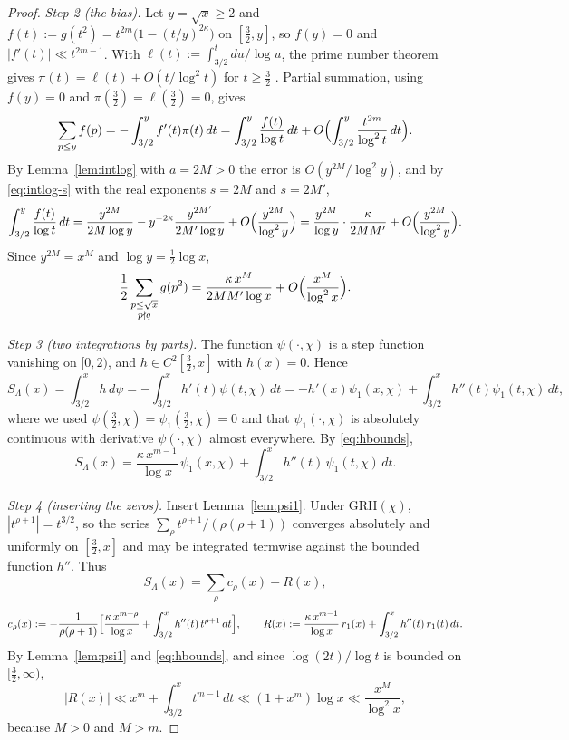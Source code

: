\documentclass[11pt]{amsart}
\theoremstyle{definition}
\numberwithin{equation}{section}
\begin{document}
\begin{proof}
\emph{Step 2 (the bias).} Let $y=\sqrt x\ge2$ and
$f(t):=g(t^2)=t^{2m}\bigl(1-(t/y)^{2\kappa}\bigr)$ on $[\tfrac32,y]$,
so $f(y)=0$ and $|f'(t)|\ll t^{2m-1}$. With
$\ell(t):=\int_{3/2}^t du/\log u$, the prime number theorem gives
$\pi(t)=\ell(t)+O(t/\log^2t)$ for $t\ge\tfrac32$
\cite[\S18]{Dav00}. Partial summation, using $f(y)=0$ and
$\pi(\tfrac32)=\ell(\tfrac32)=0$, gives
\[
\sum_{p\le y}f(p)=-\int_{3/2}^yf'(t)\pi(t)\,dt
=\int_{3/2}^y\frac{f(t)}{\log t}\,dt
+O\Bigl(\int_{3/2}^y\frac{t^{2m}}{\log^2t}\,dt\Bigr).
\]
By Lemma~\ref{lem:intlog} with $a=2M>0$ the error is
$O(y^{2M}/\log^2y)$, and by \eqref{eq:intlog-s} with the real
exponents $s=2M$ and $s=2M'$,
\[
\int_{3/2}^y\frac{f(t)}{\log t}\,dt
=\frac{y^{2M}}{2M\log y}-y^{-2\kappa}\frac{y^{2M'}}{2M'\log y}
+O\Bigl(\frac{y^{2M}}{\log^2y}\Bigr)
=\frac{y^{2M}}{\log y}\cdot\frac{\kappa}{2MM'}
+O\Bigl(\frac{y^{2M}}{\log^2y}\Bigr).
\]
Since $y^{2M}=x^M$ and $\log y=\tfrac12\log x$,
\begin{equation}\label{eq:biasterm}
\frac12\sum_{\substack{p\le\sqrt x\\ p\nmid q}}g(p^2)
=\frac{\kappa\,x^M}{2MM'\log x}+O\Bigl(\frac{x^M}{\log^2x}\Bigr).
\end{equation}

\emph{Step 3 (two integrations by parts).} The function
$\psi(\cdot,\chi)$ is a step function vanishing on $[0,2)$, and
$h\in C^2[\tfrac32,x]$ with $h(x)=0$. Hence
\[
S_\Lambda(x)=\int_{3/2}^xh\,d\psi=-\int_{3/2}^xh'(t)\psi(t,\chi)\,dt
=-h'(x)\psi_1(x,\chi)+\int_{3/2}^xh''(t)\psi_1(t,\chi)\,dt ,
\]
where we used $\psi(\tfrac32,\chi)=\psi_1(\tfrac32,\chi)=0$ and that
$\psi_1(\cdot,\chi)$ is absolutely continuous with derivative
$\psi(\cdot,\chi)$ almost everywhere. By \eqref{eq:hbounds},
\begin{equation}\label{eq:SLpsi1}
S_\Lambda(x)=\frac{\kappa\,x^{m-1}}{\log x}\,\psi_1(x,\chi)
+\int_{3/2}^xh''(t)\,\psi_1(t,\chi)\,dt .
\end{equation}

\emph{Step 4 (inserting the zeros).} Insert Lemma~\ref{lem:psi1}.
Under GRH$(\chi)$, $|t^{\rho+1}|=t^{3/2}$, so the series
$\sum_\rho t^{\rho+1}/(\rho(\rho+1))$ converges absolutely and
uniformly on $[\tfrac32,x]$ and may be integrated termwise against
the bounded function $h''$. Thus
\begin{equation}\label{eq:SLzeros}
S_\Lambda(x)=\sum_\rho c_\rho(x)+R(x),
\end{equation}
\[
c_\rho(x):=-\frac{1}{\rho(\rho+1)}\Bigl[\frac{\kappa\,x^{m+\rho}}{\log x}
+\int_{3/2}^xh''(t)\,t^{\rho+1}\,dt\Bigr],
\qquad
R(x):=\frac{\kappa\,x^{m-1}}{\log x}\,r_1(x)+\int_{3/2}^xh''(t)\,r_1(t)\,dt .
\]
By Lemma~\ref{lem:psi1} and \eqref{eq:hbounds}, and since
$\log(2t)/\log t$ is bounded on $[\tfrac32,\infty)$,
\[
|R(x)|\ll x^m+\int_{3/2}^xt^{m-1}\,dt\ll(1+x^m)\log x
\ll\frac{x^M}{\log^2x},
\]
because $M>0$ and $M>m$.


\end{proof}
\end{document}
